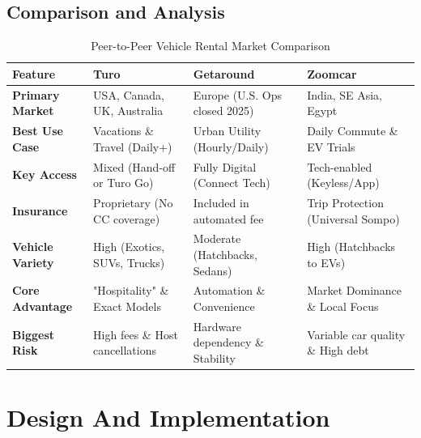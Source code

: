 \documentclass[12pt,a4paper]{report}
\begin{document}
    \section{Comparison and Analysis}
    \begin{table}[H]
    \centering
    
    \label{tab:p2p_comparison}
    \small %
    \begin{tabularx}{\textwidth}{l Y Y Y}
        \toprule
        \textbf{Feature} & \textbf{Turo} & \textbf{Getaround} & \textbf{Zoomcar} \\ 
        \midrule
        \textbf{Primary Market} & USA, Canada, UK, Australia & Europe (U.S. Ops closed 2025) & India, SE Asia, Egypt \\ \addlinespace
        
        \textbf{Best Use Case} & Vacations \& Travel (Daily+) & Urban Utility (Hourly/Daily) & Daily Commute \& EV Trials \\ \addlinespace
        
        \textbf{Key Access} & Mixed (Hand-off or Turo Go) & Fully Digital (Connect Tech) & Tech-enabled (Keyless/App) \\ \addlinespace
        
        \textbf{Insurance} & Proprietary (No CC coverage) & Included in automated fee & Trip Protection (Universal Sompo) \\ \addlinespace
        
        \textbf{Vehicle Variety} & High (Exotics, SUVs, Trucks) & Moderate (Hatchbacks, Sedans) & High (Hatchbacks to EVs) \\ \addlinespace
        
        \textbf{Core Advantage} & "Hospitality" \& Exact Models & Automation \& Convenience & Market Dominance \& Local Focus \\ \addlinespace
        
        \textbf{Biggest Risk} & High fees \& Host cancellations & Hardware dependency \& Stability & Variable car quality \& High debt \\ 
        \bottomrule
    \end{tabularx}
    \caption{Peer-to-Peer Vehicle Rental Market Comparison}
\end{table}

	
	
\chapter{Design And Implementation}
\end{document}
